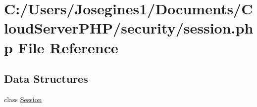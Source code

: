 \hypertarget{session_8php}{}\section{C\+:/\+Users/\+Josegines1/\+Documents/\+Cloud\+Server\+P\+H\+P/security/session.php File Reference}
\label{session_8php}
\subsection*{Data Structures}
\begin{DoxyCompactItemize}
\item 
class \mbox{\hyperlink{class_session}{Session}}
\end{DoxyCompactItemize}
